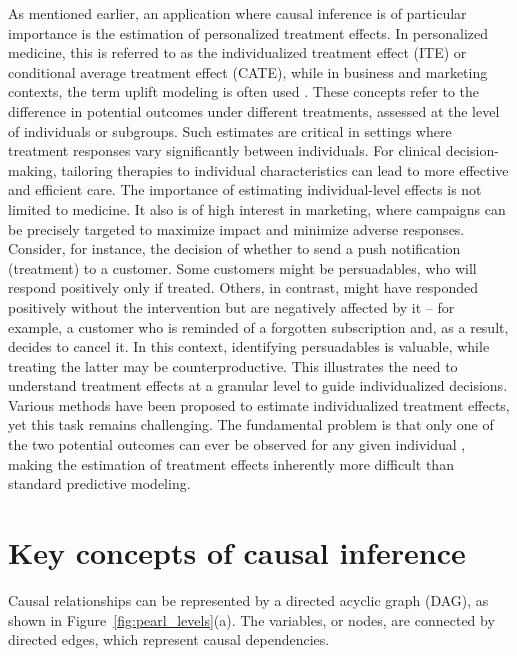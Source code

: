 As mentioned earlier, an application where causal inference is of particular importance is the estimation of personalized treatment effects. In personalized medicine, this is referred to as the individualized treatment effect (ITE) or conditional average treatment effect (CATE), while in business and marketing contexts, the term uplift modeling is often used \citep{gutierrez2017, zhao2020}. These concepts refer to the difference in potential outcomes under different treatments, assessed at the level of individuals or subgroups. Such estimates are critical in settings where treatment responses vary significantly between individuals. For clinical decision-making, tailoring therapies to individual characteristics can lead to more effective and efficient care. The importance of estimating individual-level effects is not limited to medicine. It also is of high interest in marketing, where campaigns can be precisely targeted to maximize impact and minimize adverse responses. Consider, for instance, the decision of whether to send a push notification (treatment) to a customer. Some customers might be persuadables, who will respond positively only if treated. Others, in contrast, might have responded positively without the intervention but are negatively affected by it -- for example, a customer who is reminded of a forgotten subscription and, as a result, decides to cancel it. In this context, identifying persuadables is valuable, while treating the latter may be counterproductive. This illustrates the need to understand treatment effects at a granular level to guide individualized decisions.
Various methods have been proposed to estimate individualized treatment effects, yet this task remains challenging. The fundamental problem is that only one of the two potential outcomes can ever be observed for any given individual \citep{holland1986}, making the estimation of treatment effects inherently more difficult than standard predictive modeling.









\section{Key concepts of causal inference}

Causal relationships can be represented by a directed acyclic graph (DAG), as shown in Figure~\ref{fig:pearl_levels}(a). The variables, or nodes, are connected by directed edges, which represent causal dependencies.

